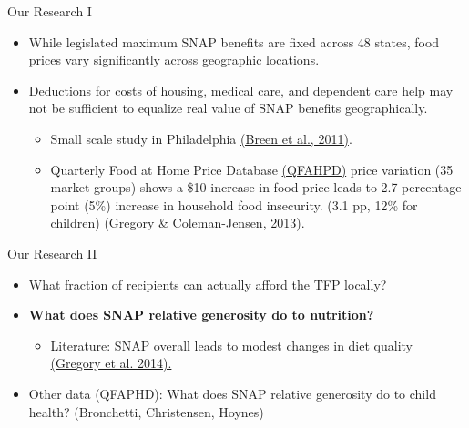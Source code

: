 \documentclass{beamer}
\begin{document}
\begin{frame}{Our Research I}
\begin{itemize}
\item
 While legislated maximum SNAP benefits are fixed across 48 states, food prices vary significantly across geographic locations.
\item Deductions for costs of housing, medical care, and dependent care help may not be sufficient to equalize real value of SNAP benefits geographically.
\begin{itemize}
\item Small scale study in Philadelphia \href{http://www.childrenshealthwatch.org/publication/real-cost-of-a-healthy-diet-2011/}{(Breen et al., 2011)}.
\item  Quarterly Food at Home Price Database \href{http://www.ers.usda.gov/data-products/quarterly-food-at-home-price-database.aspx}{(QFAHPD)} price variation (35 market groups) shows  a \$10 increase in food price leads to 2.7 percentage point (5\%) increase in household food insecurity. (3.1 pp, 12\% for children) \href{http://aepp.oxfordjournals.org/content/35/4/679}{(Gregory \& Coleman-Jensen, 2013)}.
\end{itemize}
\end{itemize}
\end{frame}

\begin{frame}{Our Research II}
\begin{itemize}
\item
 What fraction of recipients can actually afford the TFP locally?
\item 
\textbf{What does SNAP relative generosity do to nutrition?}
\begin{itemize}
\item Literature: SNAP overall leads to modest changes in diet quality \href{https://www.ers.usda.gov/webdocs/publications/45059/36939_err147.pdf?v=41388}{(Gregory et al. 2014).}
\end{itemize}
\vskip0.25in
\item Other data (QFAPHD): 
 What does SNAP relative generosity do to child health? (Bronchetti, Christensen, Hoynes)
\end{itemize}
\end{frame}

\end{document}
